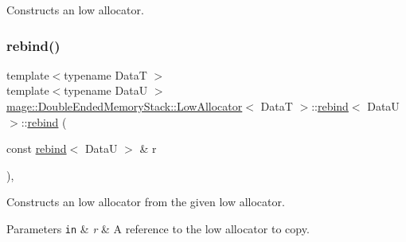 Constructs an low allocator. \hypertarget{structmage_1_1_double_ended_memory_stack_1_1_low_allocator_1_1rebind_a1799f1e7ba9543496e9624d522087695}{}\label{structmage_1_1_double_ended_memory_stack_1_1_low_allocator_1_1rebind_a1799f1e7ba9543496e9624d522087695} 
\subsubsection{\texorpdfstring{rebind()}{rebind()}\hspace{0.1cm}{\footnotesize\ttfamily [2/3]}}
{\footnotesize\ttfamily template$<$typename DataT $>$ \\
template$<$typename DataU $>$ \\
\hyperlink{structmage_1_1_double_ended_memory_stack_1_1_low_allocator}{mage\+::\+Double\+Ended\+Memory\+Stack\+::\+Low\+Allocator}$<$ DataT $>$\+::\hyperlink{structmage_1_1_double_ended_memory_stack_1_1_low_allocator_1_1rebind}{rebind}$<$ DataU $>$\+::\hyperlink{structmage_1_1_double_ended_memory_stack_1_1_low_allocator_1_1rebind}{rebind} (\begin{DoxyParamCaption}\item[{const \hyperlink{structmage_1_1_double_ended_memory_stack_1_1_low_allocator_1_1rebind}{rebind}$<$ DataU $>$ \&}]{r }\end{DoxyParamCaption})\hspace{0.3cm}{\ttfamily [private]}, {\ttfamily [delete]}}

Constructs an low allocator from the given low allocator.


\begin{DoxyParams}[1]{Parameters}
\mbox{\tt in}  & {\em r} & A reference to the low allocator to copy. \\
\hline
\end{DoxyParams}
\hypertarget{structmage_1_1_double_ended_memory_stack_1_1_low_allocator_1_1rebind_abea4a27c89b8c8db309693b80d1023bb}{}\label{structmage_1_1_double_ended_memory_stack_1_1_low_allocator_1_1rebind_abea4a27c89b8c8db309693b80d1023bb} 
